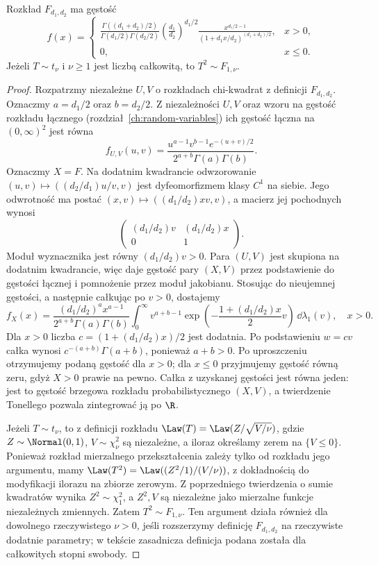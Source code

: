 \begin{stwierdzenie}
Rozkład $F_{d_1,d_2}$ ma gęstość
\[
f(x)=
\begin{cases}
\displaystyle\frac{\Gamma((d_1+d_2)/2)}
{\Gamma(d_1/2)\Gamma(d_2/2)}
\left(\frac{d_1}{d_2}\right)^{d_1/2}
\frac{x^{d_1/2-1}}{(1+d_1x/d_2)^{(d_1+d_2)/2}},
&x>0,\\
0,&x\leq0.
\end{cases}
\]
Jeżeli $T\sim t_\nu$ i $\nu\geq1$ jest liczbą całkowitą, to $T^2\sim F_{1,\nu}$.
\end{stwierdzenie}
\begin{proof}
Rozpatrzmy niezależne $U,V$ o rozkładach chi-kwadrat
z definicji $F_{d_1,d_2}$.
Oznaczmy $a=d_1/2$ oraz $b=d_2/2$.
Z niezależności $U,V$ oraz wzoru na gęstość rozkładu
łącznego (rozdział~\ref{ch:random-variables}) ich gęstość
łączna na $(0,\infty)^2$ jest równa
\[
f_{U,V}(u,v)=\frac{u^{a-1}v^{b-1}e^{-(u+v)/2}}
{2^{a+b}\Gamma(a)\Gamma(b)}.
\]
Oznaczmy $X=F$. Na dodatnim kwadrancie odwzorowanie
$(u,v)\mapsto((d_2/d_1)u/v,v)$ jest dyfeomorfizmem
klasy $C^1$ na siebie. Jego odwrotność ma postać
$(x,v)\mapsto((d_1/d_2)xv,v)$, a macierz jej pochodnych
wynosi
\[
\begin{pmatrix}
(d_1/d_2)v&(d_1/d_2)x\\
0&1
\end{pmatrix}.
\]
Moduł wyznacznika jest równy $(d_1/d_2)v>0$.
Para $(U,V)$ jest skupiona na dodatnim kwadrancie,
więc 
daje gęstość pary $(X,V)$ przez podstawienie do gęstości
łącznej i pomnożenie przez moduł jakobianu.
Stosując 
do nieujemnej gęstości, a następnie całkując po $v>0$,
dostajemy
\[
f_X(x)=\frac{(d_1/d_2)^a x^{a-1}}
{2^{a+b}\Gamma(a)\Gamma(b)}
\int_0^\infty v^{a+b-1}
\exp\!\left(-\frac{1+(d_1/d_2)x}{2}v\right)
\,\dd\lambda_1(v),\quad x>0.
\]
Dla $x>0$ liczba $c=(1+(d_1/d_2)x)/2$ jest dodatnia.
Po podstawieniu $w=cv$ całka wynosi
$c^{-(a+b)}\Gamma(a+b)$, ponieważ $a+b>0$.
Po uproszczeniu otrzymujemy podaną gęstość dla $x>0$;
dla $x\leq0$ przyjmujemy gęstość równą zeru,
gdyż $X>0$ prawie na pewno.
Całka z uzyskanej gęstości jest równa jeden: jest to
gęstość brzegowa rozkładu probabilistycznego $(X,V)$,
a twierdzenie Tonellego pozwala zintegrować ją po $\R$.

Jeżeli $T\sim t_\nu$, to z definicji rozkładu
$\Law(T)=\Law(Z/\sqrt{V/\nu})$, gdzie
$Z\sim\Normal(0,1)$, $V\sim\chi_\nu^2$ są niezależne,
a iloraz określamy zerem na $\{V\leq0\}$.
Ponieważ rozkład mierzalnego przekształcenia zależy
tylko od rozkładu jego argumentu, mamy
$\Law(T^2)=\Law((Z^2/1)/(V/\nu))$, z dokładnością
do modyfikacji ilorazu na zbiorze zerowym.
Z poprzedniego twierdzenia o sumie kwadratów wynika
$Z^2\sim\chi_1^2$, a $Z^2,V$ są niezależne jako
mierzalne funkcje niezależnych zmiennych.
Zatem $T^2\sim F_{1,\nu}$. Ten argument działa
również dla dowolnego rzeczywistego $\nu>0$, jeśli
rozszerzymy definicję $F_{d_1,d_2}$ na rzeczywiste
dodatnie parametry; w tekście zasadnicza definicja
podana została dla całkowitych stopni swobody.
\end{proof}

